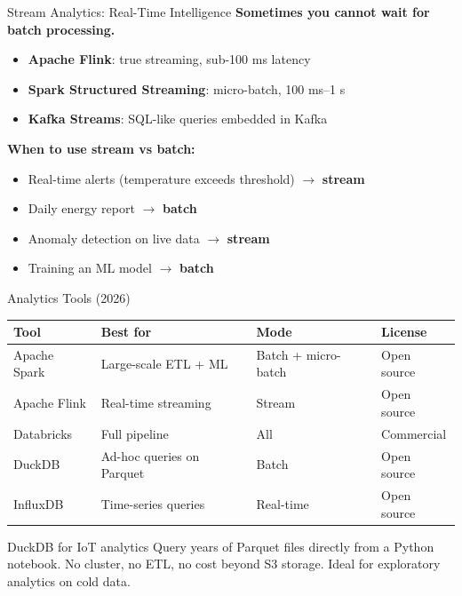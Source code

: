 \documentclass[aspectratio=169,11pt]{beamer}
\begin{document}
\begin{frame}{Stream Analytics: Real-Time Intelligence}
    \textbf{Sometimes you cannot wait for batch processing.}

    \vspace{0.3cm}
    \begin{itemize}
        \item \textbf{Apache Flink}: true streaming, sub-100 ms latency
        \item \textbf{Spark Structured Streaming}: micro-batch, 100 ms--1 s
        \item \textbf{Kafka Streams}: SQL-like queries embedded in Kafka
    \end{itemize}

    \vspace{0.3cm}
    \textbf{When to use stream vs batch:}
    \begin{itemize}
        \item Real-time alerts (temperature exceeds threshold) $\rightarrow$ \textbf{stream}
        \item Daily energy report $\rightarrow$ \textbf{batch}
        \item Anomaly detection on live data $\rightarrow$ \textbf{stream}
        \item Training an ML model $\rightarrow$ \textbf{batch}
    \end{itemize}
\end{frame}

\begin{frame}{Analytics Tools (2026)}
    \begin{center}
    \begin{tabular}{llll}
        \toprule
        \textbf{Tool} & \textbf{Best for} & \textbf{Mode} & \textbf{License} \\
        \midrule
        Apache Spark & Large-scale ETL + ML & Batch + micro-batch & Open source \\
        Apache Flink & Real-time streaming & Stream & Open source \\
        Databricks & Full pipeline & All & Commercial \\
        DuckDB & Ad-hoc queries on Parquet & Batch & Open source \\
        InfluxDB & Time-series queries & Real-time & Open source \\
        \bottomrule
    \end{tabular}
    \end{center}

    \vspace{0.3cm}
    \begin{exampleblock}{DuckDB for IoT analytics}
        Query years of Parquet files directly from a Python notebook. No cluster, no ETL, no cost beyond S3 storage. Ideal for exploratory analytics on cold data.
    \end{exampleblock}
\end{frame}
\end{document}
